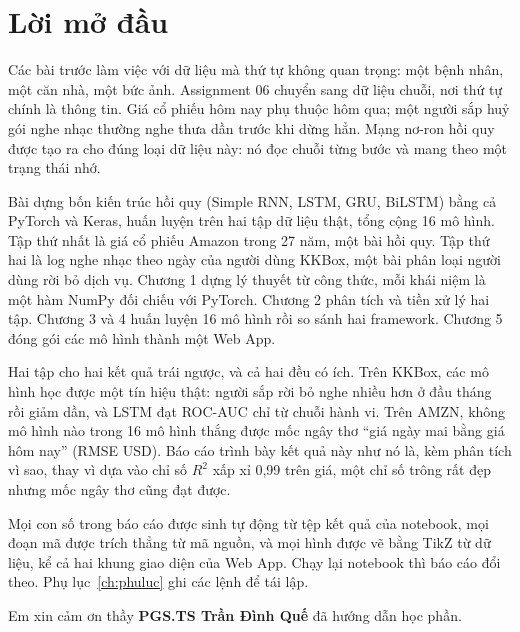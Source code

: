 \chapter*{Lời mở đầu}

Các bài trước làm việc với dữ liệu mà thứ tự không quan trọng: một bệnh nhân, một căn nhà, một bức ảnh. Assignment 06
chuyển sang dữ liệu chuỗi, nơi thứ tự chính là thông tin. Giá cổ phiếu hôm nay phụ thuộc hôm qua; một người sắp huỷ gói
nghe nhạc thường nghe thưa dần trước khi dừng hẳn. Mạng nơ-ron hồi quy được tạo ra cho đúng loại dữ liệu này: nó đọc
chuỗi từng bước và mang theo một trạng thái nhớ.

Bài dựng bốn kiến trúc hồi quy (Simple RNN, LSTM, GRU, BiLSTM) bằng cả PyTorch và Keras, huấn luyện trên hai tập dữ liệu
thật, tổng cộng 16 mô hình. Tập thứ nhất là giá cổ phiếu Amazon trong 27 năm, một bài hồi quy. Tập thứ hai là log nghe
nhạc theo ngày của  người dùng KKBox, một bài phân loại người dùng rời bỏ dịch vụ. Chương 1 dựng lý
thuyết từ công thức, mỗi khái niệm là một hàm NumPy đối chiếu với PyTorch. Chương 2 phân tích và tiền xử lý hai tập.
Chương 3 và 4 huấn luyện 16 mô hình rồi so sánh hai framework. Chương 5 đóng gói các mô hình thành một Web App.

Hai tập cho hai kết quả trái ngược, và cả hai đều có ích. Trên KKBox, các mô hình học được một tín hiệu thật: người sắp
rời bỏ nghe nhiều hơn ở đầu tháng rồi giảm dần, và LSTM đạt ROC-AUC  chỉ từ chuỗi
hành vi. Trên AMZN, không mô hình nào trong 16 mô hình thắng được mốc ngây thơ ``giá ngày mai bằng giá hôm nay''
(RMSE  USD). Báo cáo trình bày kết quả này như nó là, kèm phân tích vì sao, thay vì dựa vào chỉ số
$R^2$ xấp xỉ 0,99 trên giá, một chỉ số trông rất đẹp nhưng mốc ngây thơ cũng đạt được.

Mọi con số trong báo cáo được sinh tự động từ tệp kết quả của notebook, mọi đoạn mã được trích thẳng từ mã nguồn, và mọi
hình được vẽ bằng TikZ từ dữ liệu, kể cả hai khung giao diện của Web App. Chạy lại notebook thì báo cáo đổi theo.
Phụ lục~\ref{ch:phuluc} ghi các lệnh để tái lập.

Em xin cảm ơn thầy \textbf{PGS.TS Trần Đình Quế} đã hướng dẫn học phần.

